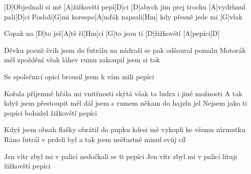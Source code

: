 
[D]Objednali si mě [A]\null žižkovští pepí[D]ci
[D]abych jim prej trochu [A]vydrhnul pali[D]ci
Poslali[G]mi korespo[A]nďák
napsali[Hm] kdy přesně jede mi [G]vlak

Copak na [D]to ješ[A]tě ří[Hm]ci
[G]to jsou ti [D]\null žižkovští [A]pepíci[D]


Děvku poezii švih jsem do futrálu
na nádraží se pak odšoural pomalu
Motorák měl zpoždění však
láhev rumu zakoupil jsem si tak

Se společnicí opicí
brousil jsem k vám milí pepíci

Kořala příjemně hřála mi vnitřnosti
skýtá však ta ludra i jiné možnosti
A tak když jsem přestoupit měl
dál jsem s rumem někam do hajzlu jel
Nejsem jako ti popíci
bohužel žižkovští pepíci

Když jsem obsah flašky obrátil do pupku
kdesi mě vykopli ke všemu zármutku
Ráno futrál v prdeli byl
a tak jsem nešťastně minul svůj cíl

Jen vítr zbyl mi v palici
nedočkali se ti pepíci
Jen vítr zbyl mi v palici
lituji žižkovští pepíci
